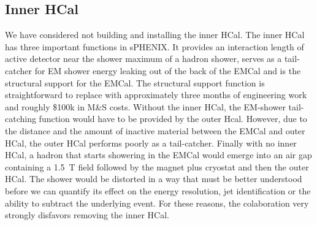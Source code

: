 \subsection{Inner HCal}
\label{ihcal}

We have considered not building and installing the inner HCal.  The
inner HCal has three important functions in sPHENIX.  It provides an
interaction length of active detector near the shower maximum of a
hadron shower, serves as a tail-catcher for EM shower energy leaking
out of the back of the EMCal and is the structural support for the
EMCal.  The structural support function is straightforward to replace
with approximately three months of engineering work and roughly \$100k
in M\&S costs.  Without the inner HCal, the EM-shower tail-catching
function would have to be provided by the outer Hcal.  However, due to
the distance and the amount of inactive material between the EMCal and
outer HCal, the outer HCal performs poorly as a tail-catcher.  Finally
with no inner HCal, a hadron that starts showering in the EMCal would
emerge into an air gap containing a 1.5~T field followed by the magnet
plus cryostat and then the outer HCal.  The shower would be distorted
in a way that must be better understood before we can quantify its
effect on the energy resolution, jet identification or the ability to
subtract the underlying event.  For these reasons, the colaboration
very strongly disfavors removing the inner HCal.

